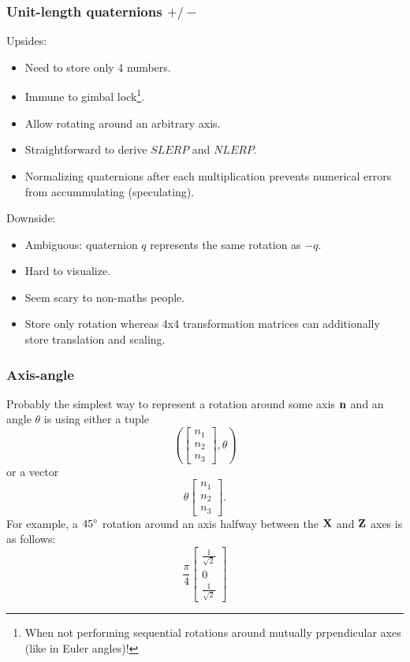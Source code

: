 \documentclass{beamer}
\begin{document}
\begin{frame}
\frametitle{Unit-length quaternions $+/-$}
Upsides:
\begin{itemize}
	\item Need to store only 4 numbers.
	\item Immune to gimbal lock\footnote{When not performing sequential rotations around mutually prpendicular axes (like in Euler angles)!}.
	\item Allow rotating around an arbitrary axis.
	\item Straightforward to derive $SLERP$ and $NLERP$. 
	\item Normalizing quaternions after each multiplication prevents numerical errors from accummulating (speculating). 
\end{itemize}
Downside:
\begin{itemize}
	\item Ambiguous: quaternion $q$ represents the same rotation as $-q$.
	\item Hard to visualize.
	\item Seem scary to non-maths people.
	\item Store only rotation whereas 4x4 transformation matrices can additionally store translation and scaling.
\end{itemize}
\end{frame}
    

\begin{frame}
\frametitle{Axis-angle}
Probably the simplest way to represent a rotation around some axis $\mathbf{n}$ and an angle $\theta$ is using either a tuple
$$
\left(\begin{bmatrix}
n_1 \\
n_2 \\
n_3	
\end{bmatrix}, \theta\right) 
$$
or a vector
$$
	\theta \begin{bmatrix}
	n_1 \\
	n_2 \\
	n_3	
\end{bmatrix}.
$$
For example, a ${45}^{\circ}$ rotation around an axis halfway between the $\grotaxis{X}$ and $\grotaxis{Z}$ axes is as follows:
$$
\frac{\pi}{4} \begin{bmatrix}
	\frac{1}{\sqrt{2}}  \\
	0 \\
	\frac{1}{\sqrt{2}}
\end{bmatrix}
$$
\end{frame}
\end{document}
